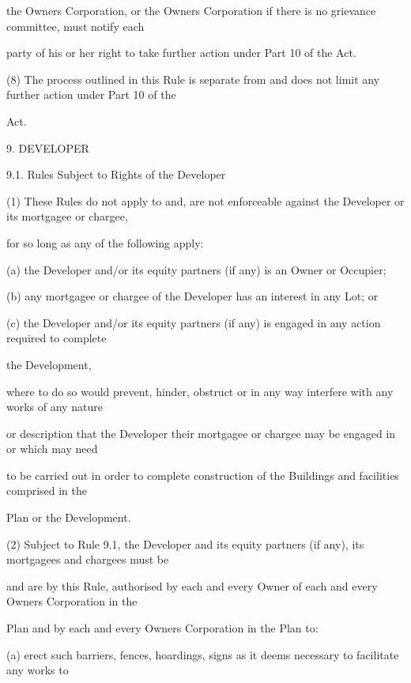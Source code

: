 \documentclass{article}
\begin{document}
{\fontsize{10.02}{1}the Owners Corporation, or the Owners Corporation if there is no grievance committee, must notify each }

{\fontsize{10.02}{1}party of his or her right to take further action under Part 10 of the Act. }

{\fontsize{9.962}{1}(8) The process outlined in this Rule is separate from and does not limit any further action under Part 10 of the }

{\fontsize{10.02}{1}Act. }


{\fontsize{9.99}{1}9. DEVELOPER }

{\fontsize{9.99}{1}9.1. Rules Subject to Rights of the Developer }

{\fontsize{9.962}{1}(1) These Rules do not apply to and, are not enforceable against the Developer or its mortgagee or chargee, }

{\fontsize{10.02}{1}for so long as any of the following apply: }

{\fontsize{9.962}{1}(a) the Developer and/or its equity partners (if any) is an Owner or Occupier; }

{\fontsize{9.962}{1}(b) any mortgagee or chargee of the Developer has an interest in any Lot; or }

{\fontsize{9.962}{1}(c) the Developer and/or its equity partners (if any) is engaged in any action required to complete }

{\fontsize{10.02}{1}the Development, }

{\fontsize{10.02}{1}where to do so would prevent, hinder, obstruct or in any way interfere with any works of any nature }

{\fontsize{10.02}{1}or description that the Developer their mortgagee or chargee may be engaged in or which may need }

{\fontsize{10.02}{1}to be carried out in order to complete construction of the Buildings and facilities comprised in the }

{\fontsize{10.02}{1}Plan or the Development. }

{\fontsize{9.962}{1}(2) Subject to Rule 9.1, the Developer and its equity partners (if any), its mortgagees and chargees must be }

{\fontsize{10.02}{1}and are by this Rule, authorised by each and every Owner of each and every Owners Corporation in the }

{\fontsize{10.02}{1}Plan and by each and every Owners Corporation in the Plan to: }

{\fontsize{9.962}{1}(a) erect such barriers, fences, hoardings, signs as it deems necessary to facilitate any works to }
\end{document}
